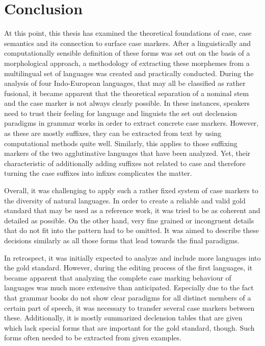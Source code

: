 \documentclass[11pt,a4paper,twoside,openright]{scrbook}
\begin{document}
\chapter{Conclusion}

At this point, this thesis has examined the theoretical foundations of case, case semantics and its connection to surface case markers. After a linguistically and computationally sensible definition of these forms was set out on the basis of a morphological approach, a methodology of extracting these morphemes from a multilingual set of languages was created and practically conducted. During the analysis of four Indo-European languages, that may all be classified as rather fusional, it became apparent that the theoretical separation of a nominal stem and the case marker is not always clearly possible. In these instances, speakers need to trust their feeling for language and linguists the set out declension paradigms in grammar works in order to extract concrete case markers. However, as these are mostly suffixes, they can be extracted from text by using computational methods quite well. Similarly, this applies to those suffixing markers of the two agglutinative languages that have been analyzed. Yet, their characteristic of additionally adding suffixes not related to case and therefore turning the case suffixes into infixes complicates the matter.

Overall, it was challenging to apply such a rather fixed system of case markers to the diversity of natural languages. In order to create a reliable and valid gold standard that may be used as a reference work, it was tried to be as coherent and detailed as possible. On the other hand, very fine grained or incongruent details that do not fit into the pattern had to be omitted. It was aimed to describe these decisions similarly as all those forms that lead towards the final paradigms.

In retrospect, it was initially expected to analyze and include more languages into the gold standard. However, during the editing process of the first languages, it became apparent that analyzing the complete case marking behaviour of languages was much more extensive than anticipated. Especially due to the fact that grammar books do not show clear paradigms for all distinct members of a certain part of speech, it was necessary to transfer several case markers between these. Additionally, it is mostly summarized declension tables that are given which lack special forms that are important for the gold standard, though. Such forms often needed to be extracted from given examples.
\end{document}
